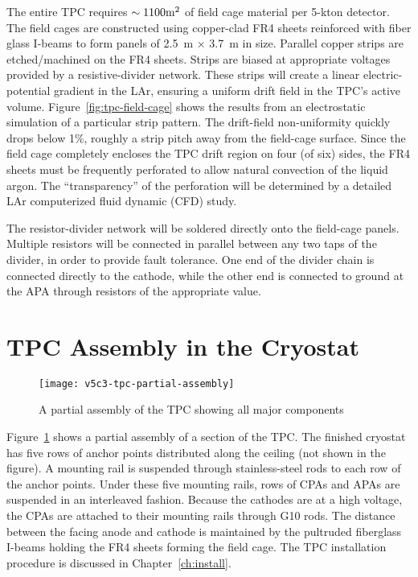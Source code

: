 The entire TPC requires $\sim 1100 \rm{m}^2$ of field 
cage material per 5-kton detector. The field cages are constructed using copper-clad FR4 sheets reinforced with fiber glass I-beams to form panels of 2.5~m $\times$ 3.7~m in size. Parallel copper strips are etched/machined
on the FR4 sheets. Strips are 
biased at appropriate voltages provided by a resistive-divider network. These strips will create
a linear electric-potential gradient in the LAr, ensuring a uniform drift 
field in the TPC's active volume.  Figure~\ref{fig:tpc-field-cage} shows 
the results from an electrostatic simulation of a particular strip pattern. 
The drift-field non-uniformity quickly drops below 1\%, roughly 
a strip pitch away from the field-cage surface. Since the field cage 
completely encloses the TPC drift region on four (of six) sides, the FR4 sheets must 
be frequently perforated to allow natural convection of the liquid argon.  
The ``transparency'' of the perforation will be determined by a 
detailed LAr computerized fluid dynamic (CFD) study.

The resistor-divider network will be soldered directly onto the field-cage panels. 
Multiple resistors will be connected in parallel between any two taps of the divider,
in order to provide fault tolerance. 
One end of the divider chain is connected directly to the cathode, while the other end is connected to ground at the APA through resistors of the appropriate value. 

\section{TPC Assembly in the Cryostat}

\begin{figure}[htbp]
\centering
\texttt{[image: v5c3-tpc-partial-assembly]}
\caption{A partial assembly of the TPC showing all major components}
\label{fig:tpc-partial-assembly}
\end{figure}

Figure~\ref{fig:tpc-partial-assembly} shows a partial assembly of a section of the TPC.
The finished cryostat has five rows of anchor points distributed along the ceiling (not shown in the figure). 
A mounting rail is suspended through stainless-steel rods to each row of the anchor points.  Under these five mounting rails, 
rows of CPAs and APAs are suspended in an interleaved fashion. 
Because the cathodes are at a high voltage, the CPAs are attached to their 
mounting rails through G10 rods. The distance between the facing anode and 
cathode is maintained by the pultruded fiberglass I-beams holding the FR4 sheets 
forming the field cage.  The TPC installation procedure 
is discussed in Chapter~\ref{ch:install}.

